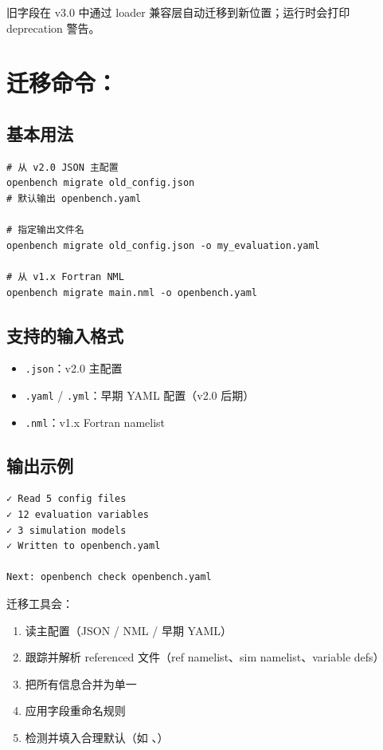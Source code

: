 旧字段在 \openbench{} v3.0 中通过 loader 兼容层自动迁移到新位置；运行时会打印 deprecation 警告。

\section{迁移命令：}

\subsection{基本用法}

\begin{verbatim}
# 从 v2.0 JSON 主配置
openbench migrate old_config.json
# 默认输出 openbench.yaml

# 指定输出文件名
openbench migrate old_config.json -o my_evaluation.yaml

# 从 v1.x Fortran NML
openbench migrate main.nml -o openbench.yaml
\end{verbatim}

\subsection{支持的输入格式}

\begin{itemize}
  \item \texttt{.json}：v2.0 主配置
  \item \texttt{.yaml} / \texttt{.yml}：早期 YAML 配置（v2.0 后期）
  \item \texttt{.nml}：v1.x Fortran namelist
\end{itemize}

\subsection{输出示例}

\begin{exampleBox}[迁移成功]
\begin{verbatim}
✓ Read 5 config files
✓ 12 evaluation variables
✓ 3 simulation models
✓ Written to openbench.yaml

Next: openbench check openbench.yaml
\end{verbatim}
\end{exampleBox}

迁移工具会：

\begin{enumerate}
  \item 读主配置（JSON / NML / 早期 YAML）
  \item 跟踪并解析 referenced 文件（ref namelist、sim namelist、variable defs）
  \item 把所有信息合并为单一 
  \item 应用字段重命名规则
  \item 检测并填入合理默认（如 、）
\end{enumerate}

